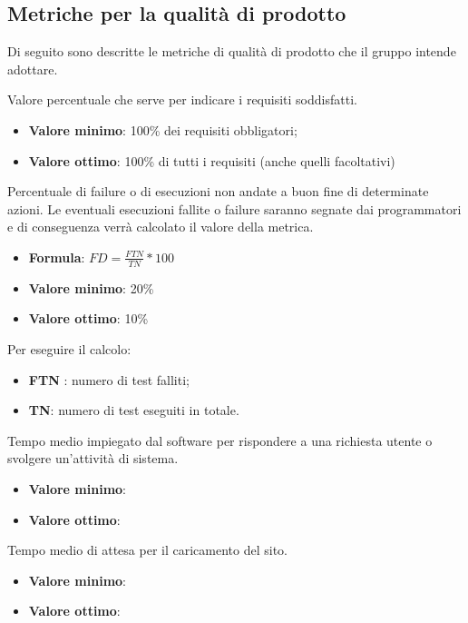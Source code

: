 \pagebreak
\setcounter{M}{0}
\subsection{Metriche per la qualità di prodotto}
Di seguito sono descritte le metriche di qualità di prodotto che il gruppo intende adottare.

Valore percentuale che serve per indicare i requisiti soddisfatti.
\begin{itemize}
    \item \textbf{Valore minimo}: 100\% dei requisiti obbligatori;
    \item \textbf{Valore ottimo}: 100\% di tutti i requisiti (anche quelli facoltativi)
\end{itemize}  

Percentuale di failure o di esecuzioni non andate a buon fine di determinate azioni. Le
eventuali esecuzioni fallite o failure saranno segnate dai programmatori e di conseguenza verrà calcolato
il valore della metrica.
\begin{itemize}
    \item \textbf{Formula}: $FD=\frac{FTN}{TN}*100$
    \item \textbf{Valore minimo}: 20\%
    \item \textbf{Valore ottimo}: 10\%
\end{itemize}  
Per eseguire il calcolo:
\begin{itemize}
    \item \textbf{FTN} : numero di test falliti;
    \item \textbf{TN}: numero di test eseguiti in totale.
\end{itemize}


Tempo medio impiegato dal software per rispondere a una richiesta utente o svolgere un’attività di sistema. 
\begin{itemize}
    \item \textbf{Valore minimo}:
    \item \textbf{Valore ottimo}:
\end{itemize}  


Tempo medio di attesa per il caricamento del sito.
\begin{itemize}
    \item \textbf{Valore minimo}:
    \item \textbf{Valore ottimo}:
\end{itemize}  


